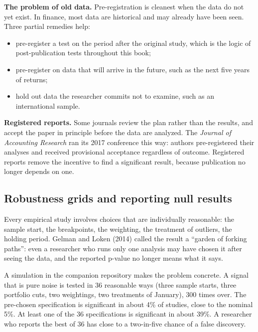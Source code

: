 \textbf{The problem of old data.} Pre-registration is cleanest when the data do not yet exist. In finance, most data are historical and may already have been seen. Three partial remedies help:

\begin{itemize}
  \item pre-register a test on the period after the original study, which is the logic of post-publication tests throughout this book;
  \item pre-register on data that will arrive in the future, such as the next five years of returns;
  \item hold out data the researcher commits not to examine, such as an international sample.
\end{itemize}

\textbf{Registered reports.} Some journals review the plan rather than the results, and accept the paper in principle before the data are analyzed. The \emph{Journal of Accounting Research} ran its 2017 conference this way: authors pre-registered their analyses and received provisional acceptance regardless of outcome. Registered reports remove the incentive to find a significant result, because publication no longer depends on one.

\subsection{Robustness grids and reporting null results}
\label{sec:23-robust}

Every empirical study involves choices that are individually reasonable: the sample start, the breakpoints, the weighting, the treatment of outliers, the holding period. Gelman and Loken (2014) called the result a ``garden of forking paths'': even a researcher who runs only one analysis may have chosen it after seeing the data, and the reported p-value no longer means what it says.

A simulation in the companion repository makes the problem concrete. A signal that is pure noise is tested in 36 reasonable ways (three sample starts, three portfolio cuts, two weightings, two treatments of January), 300 times over. The pre-chosen specification is significant in about 4\% of studies, close to the nominal 5\%. At least one of the 36 specifications is significant in about 39\%. A researcher who reports the best of 36 has close to a two-in-five chance of a false discovery.

